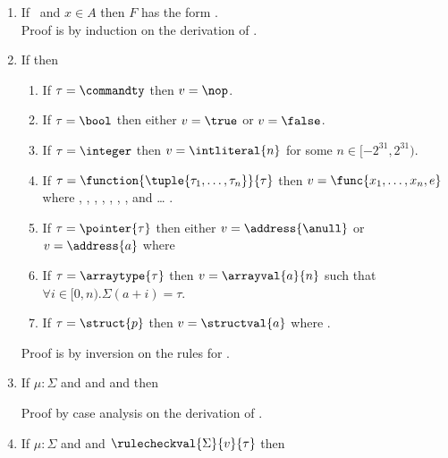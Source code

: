 \begin{enumerate}
\item \label{lemmaassigned} If \ and $x \in A$ then $F$ has the form . \\
Proof is by induction on the derivation of .

\item \label{cfl} If  then
\begin{enumerate}
\item If $\tau = \commandty$ then $v = \nop$.
\item If $\tau = \bool$ then either $v = \true$ or $v = \false$.
\item If $\tau = \integer$ then $v = \intliteral{n}$ for some $n \in [-2^{31},2^{31})$.
\item If $\tau = \function{\tuple{\tau_1, \ldots, \tau_n}}{\tau}$ then $v = \func{x_1, \ldots, x_n, e}$ where , , , , , , , and  \ldots{} .
\item If $\tau = \pointer{\tau}$ then either $v = \address{\anull}$ or $v = \address{a}$ where 
\item If $\tau = \arraytype{\tau}$ then $v = \arrayval{a}{n}$ such that $\forall i \in [0,n).\Sigma(a+i) = \tau$.
\item If $\tau = \struct{p}$ then $v = \structval{a}$ where .
\end{enumerate}

Proof is by inversion on the rules for .

\item \label{binopprogress} If $\mu : \Sigma$ and  and  and  then 

  Proof by case analysis on the derivation of .

\item \label{monopprogress} If $\mu : \Sigma$ and  and $\rulecheckval{\Sigma}{v}{\tau}$ then 


\end{enumerate}
